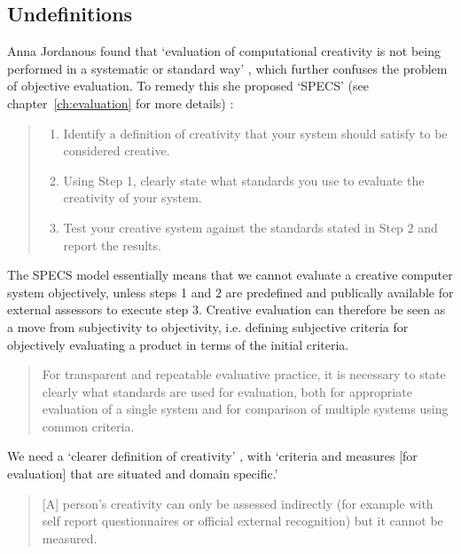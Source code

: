 

\subsection{Undefinitions}

Anna Jordanous found that `evaluation of computational creativity is not being performed in a systematic or standard way' \autocite{Jordanous2011}, which further confuses the problem of objective evaluation. To remedy this she proposed `\ac{SPECS}' (see chapter~\ref{ch:evaluation} for more details) \autocite{Jordanous2012a}:

\begin{quote}
  \begin{enumerate}
    \item Identify a definition of creativity that your system should satisfy to be considered creative.
    \item Using Step \num{1}, clearly state what standards you use to evaluate the creativity of your system.
    \item Test your creative system against the standards stated in Step \num{2} and report the results.
  \end{enumerate}
\end{quote}

The \ac{SPECS} model essentially means that we cannot evaluate a creative computer system objectively, unless steps \num{1} and \num{2} are predefined and publically available for external assessors to execute step \num{3}. Creative evaluation can therefore be seen as a move from subjectivity to objectivity, i.e. defining subjective criteria for objectively evaluating a product in terms of the initial criteria.

\begin{quotation}
  For transparent and repeatable evaluative practice, it is necessary to state clearly what standards are used for evaluation, both for appropriate evaluation of a single system and for comparison of multiple systems using common criteria. 
\end{quotation}

We need a `clearer definition of creativity' \autocite[p.459]{Mayer1999}, with `criteria and measures [for evaluation] that are situated and domain specific.' \autocite[p.7]{Candy2012}

\begin{quotation}
  [A] person's creativity can only be assessed indirectly (for example with self report questionnaires or official external recognition) but it cannot be measured. 
\end{quotation}

